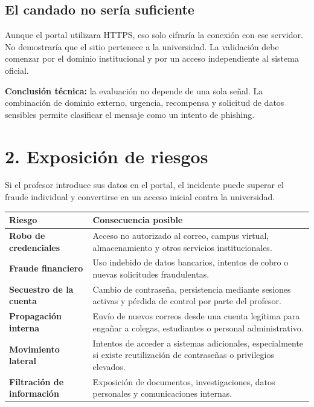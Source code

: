 \documentclass[11pt,a4paper]{article}
\newcommand{\infobox}[1]{%
  \noindent\colorbox{fondo}{\parbox{\dimexpr\textwidth-2\fboxsep}{#1}}}
\newcommand{\reportpage}{\clearpage\thispagestyle{fancy}}
\begin{document}
\subsection*{El candado no sería suficiente}

Aunque el portal utilizara HTTPS, eso solo cifraría la conexión con ese servidor. No demostraría que el sitio pertenece a la universidad. La validación debe comenzar por el dominio institucional y por un acceso independiente al sistema oficial.

\infobox{\textcolor{alerta}{\textbf{Conclusión técnica:}} la evaluación no depende de una sola señal. La combinación de dominio externo, urgencia, recompensa y solicitud de datos sensibles permite clasificar el mensaje como un intento de phishing.}

\reportpage
\section*{2. Exposición de riesgos}

Si el profesor introduce sus datos en el portal, el incidente puede superar el fraude individual y convertirse en un acceso inicial contra la universidad.

\begin{tabularx}{\textwidth}{>{\raggedright\arraybackslash\bfseries\color{azul}}p{3.7cm} >{\raggedright\arraybackslash}X}
  Riesgo & Consecuencia posible \\
  \toprule
  Robo de credenciales & Acceso no autorizado al correo, campus virtual, almacenamiento y otros servicios institucionales. \\
  Fraude financiero & Uso indebido de datos bancarios, intentos de cobro o nuevas solicitudes fraudulentas. \\
  Secuestro de la cuenta & Cambio de contraseña, persistencia mediante sesiones activas y pérdida de control por parte del profesor. \\
  Propagación interna & Envío de nuevos correos desde una cuenta legítima para engañar a colegas, estudiantes o personal administrativo. \\
  Movimiento lateral & Intentos de acceder a sistemas adicionales, especialmente si existe reutilización de contraseñas o privilegios elevados. \\
  Filtración de información & Exposición de documentos, investigaciones, datos personales y comunicaciones internas. \\
\end{tabularx}
\end{document}
